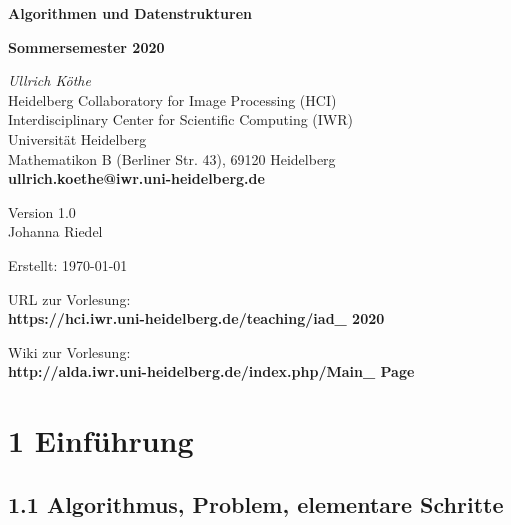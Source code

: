 \documentclass[11pt, fleqn]{scrreprt}
\begin{document}
\thispagestyle{plain}
\begin{titlepage}
	
	\begin{center}
		{\LARGE\textbf{Algorithmen und Datenstrukturen}} \medskip
		
		{\LARGE\textbf{Sommersemester 2020}}
		
		\vspace{3.7cm}
		
		{\textit{ Ullrich Köthe}} \\
		{\small Heidelberg Collaboratory for Image Processing (HCI)}
\\
		{\small Interdisciplinary Center for Scientific Computing (IWR)}
\\
		{\small Universität Heidelberg }\\
		{\small Mathematikon B (Berliner Str. 43), 69120 Heidelberg
} \\
		\textbf{ullrich.koethe@iwr.uni-heidelberg.de}
		
		\vspace{8cm}
		
		Version 1.0\\
		Johanna Riedel
		
		\bigskip
		
		Erstellt: \today
		
		\bigskip
		
		URL zur Vorlesung:  \\
		
		\textbf{https://hci.iwr.uni-heidelberg.de/teaching/iad\_ 2020}
		
		\bigskip
		
		Wiki zur Vorlesung: \\
		
		\textbf{http://alda.iwr.uni-heidelberg.de/index.php/Main\_ Page}
		
		
		
	\end{center}
\end{titlepage}
\restoregeometry

\tableofcontents

\newpage

\chapter*{1 Einführung}

\section*{1.1 Algorithmus, Problem, elementare Schritte}
\end{document}
